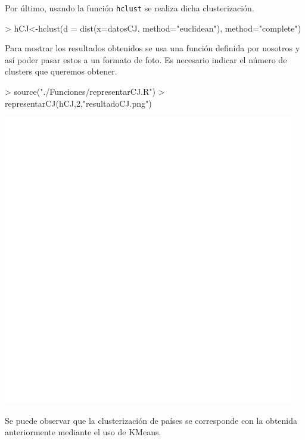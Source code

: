 \documentclass [a4paper] {article}
\begin{document}
\bigskip
Por último, usando la función \texttt{hclust} se realiza dicha clusterización.
\begin{Schunk}
\begin{Sinput}
> hCJ<-hclust(d = dist(x=datosCJ, method="euclidean"), method="complete")
\end{Sinput}
\end{Schunk}

\bigskip
Para mostrar los resultados obtenidos se usa una función definida por nosotros y así poder pasar estos
a un formato de foto. Es necesario indicar el número de clusters que queremos obtener.
\begin{Schunk}
\begin{Sinput}
> source("./Funciones/representarCJ.R")
> representarCJ(hCJ,2,"resultadoCJ.png")
\end{Sinput}
\end{Schunk}
\includegraphics[width=\textwidth]{resultadoCJ}

\bigskip
Se puede observar que la clusterización de países se corresponde con la obtenida anteriormente mediante
el uso de KMeans.
\end{document}

